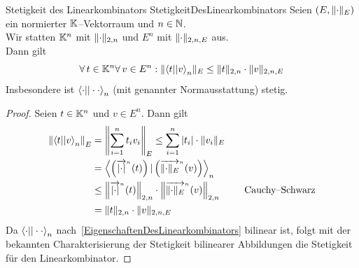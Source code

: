 \begin{lemma}{Stetigkeit des Linearkombinators}
             {StetigkeitDesLinearkombinators}
Seien $(E, \lVert\cdot\rVert_E)$ ein normierter $\mathbb{K}$--Vektorraum und $n \in \mathbb{N}$.\\
Wir statten $\mathbb{K}^n$ mit $\lVert\cdot\rVert_{2,n}$ und $E^n$ mit $\lVert\cdot\rVert_{2,n,E}$
aus.\\
Dann gilt \[
\forall\, t \in \mathbb{K}^n \forall\, v \in E^n : 
   \lVert\left\langle t ||v\right\rangle _n\rVert_E \le \lVert t\rVert_{2, n} \cdot \lVert v\rVert _{2, n, E}
\]
Insbesondere ist $\left\langle \cdot ||\cdot\cdot\right\rangle_n$ (mit genannter Normausstattung)
stetig.
\end{lemma}
\begin{proof}
Seien $t \in \mathbb{K}^n$ und $v \in E^n$.
Dann gilt
\begin{align*}
\left\|\left\langle t ||v\right\rangle_n\right\|_E 
    &= \left\|\sum_{i=1}^n t_iv_i\right\|_E 
    \le\sum_{i=1}^n \left|t_i\right|\cdot \lVert v_i\rVert_E\\
    &= \left\langle \left({\overrightarrow{\left|\cdot\right|}}^{{}_n}(t)\right) |\left({\overrightarrow{\lVert\cdot\rVert_E}}^{{}_n}(v)\right)\right\rangle_n\\
    &\le\left\|{\overrightarrow{\left|\cdot\right|}}^{{}_n}(t)\right\|_{2,n}
        \cdot
        \left\|{\overrightarrow{\lVert\cdot\rVert_E}}^{{}_n}(v)\right\|_{2, n} & \quad\text{Cauchy--Schwarz}\\
    &= \lVert t\rVert_{2, n}\cdot \lVert v\rVert_{2, n, E}
\end{align*}
Da $\left\langle \cdot ||\cdot\cdot\right\rangle_n$ nach~\ref{EigenschaftenDesLinearkombinators}
bilinear ist, folgt mit der bekannten Charakterisierung der Stetigkeit
bilinearer Abbildungen die Stetigkeit für den Linearkombinator.
\end{proof}